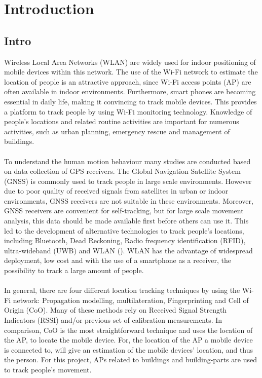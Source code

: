 \chapter{Introduction}\label{Introduction}
\section{Intro}\label{intro}
Wireless Local Area Networks (WLAN) are widely used for indoor positioning of mobile devices within this network. The use of the Wi-Fi network to estimate the location of people is an attractive approach, since Wi-Fi access points (AP) are often available in indoor environments. Furthermore, smart phones are becoming essential in daily life, making it convincing to track mobile devices. This provides a platform to track people by using Wi-Fi monitoring technology. Knowledge of people’s locations and related routine activities are important for numerous activities, such as urban planning, emergency rescue and management of buildings.\\\\
To understand the human motion behaviour many studies are conducted based on data collection of GPS receivers. The Global Navigation Satellite System (GNSS) is commonly used to track people in large scale environments. However due to poor quality of received signals from satellites in urban or indoor environments, GNSS receivers are not suitable in these environments. Moreover, GNSS receivers are convenient for self-tracking, but for large scale movement analysis, this data should be made available first before others can use it. This led to the development of alternative technologies to track people’s locations, including Bluetooth, Dead Reckoning, Radio frequency identification (RFID), ultra-wideband (UWB) and WLAN (\cite{mautz2012indoor}). WLAN has the advantage of widespread deployment, low cost and with the use of a smartphone as a receiver, the possibility to track a large amount of people.\\\\
In general, there are four different location tracking techniques by using the Wi-Fi network: Propagation modelling, multilateration, Fingerprinting and Cell of Origin (CoO). Many of these methods rely on Received Signal Strength Indicators (RSSI) and/or previous set of calibration measurements. In comparison, CoO is the most straightforward technique and uses the location of the AP, to locate the mobile device. For, the location of the AP a mobile device is connected to, will give an estimation of the mobile devices' location, and thus the person. For this project, APs related to buildings and building-parts are used to track people’s movement.\\\\
